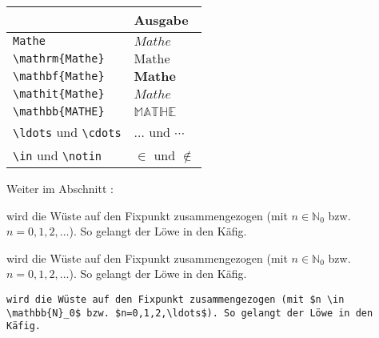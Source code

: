 \documentclass["WS\space 16-17\space -\space LaTeX-Kurs\space -\space Praesentation\space -\space 1.tex"]{subfiles}
\begin{document}
\begin{frame}[fragile]
	\begin{center}
		\begin{tabular}{ll}
			\toprule
			\color{math-cmd}{Mathe}\color{black}{-Befehl}							&	Ausgabe					\\ \midrule
			\lstinline|Mathe|				&	$Mathe$					\\
			\lstinline|\mathrm{Mathe}|		&	$\mathrm{Mathe}$		\\
			\lstinline|\mathbf{Mathe}|		&	$\mathbf{Mathe}$		\\
			\lstinline|\mathit{Mathe}|		&	$\mathit{Mathe}$		\\
			\lstinline|\mathbb{MATHE}|					&	$\mathbb{MATHE}$		\\
			\lstinline|\ldots| und \lstinline|\cdots|	&	$\ldots$ und $\cdots$	\\
			\lstinline|\in| und \lstinline|\notin|		&	$\in$ und $\notin$		\\
			\bottomrule
		\end{tabular}
	\end{center}
	\pause\btVFill
	\Aufgabee
	Weiter im Abschnitt :
	\begin{outputbox}
		wird die Wüste auf den Fixpunkt zusammengezogen (mit $n \in \mathbb{N}_0$ bzw. $n=0,1,2,\ldots$). So gelangt der Löwe in den Käfig.
	\end{outputbox}
	\vspace{1.3cm}
\end{frame}
\begin{frame}[fragile]
	\Losung
	\begin{outputbox}
		wird die Wüste auf den Fixpunkt zusammengezogen (mit $n \in \mathbb{N}_0$ bzw. $n=0,1,2,\ldots$). So gelangt der Löwe in den Käfig.
	\end{outputbox}

	\Code
	\begin{lstlisting}[gobble=4]
    wird die Wüste auf den Fixpunkt zusammengezogen (mit $n \in \mathbb{N}_0$ bzw. $n=0,1,2,\ldots$). So gelangt der Löwe in den Käfig.
	\end{lstlisting}
\end{frame}
\end{document}
